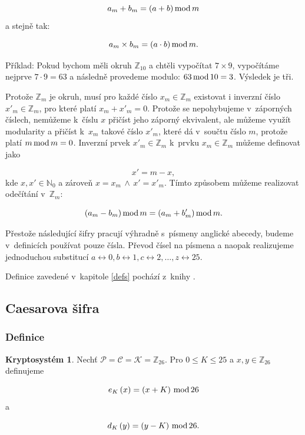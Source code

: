 \documentclass[12pt]{article}
\theoremstyle{definition}
\newtheorem{crypto}{Kryptosystém}
\newcommand{\setp}{\mathcal{P}}
\newcommand{\setc}{\mathcal{C}}
\newcommand{\setk}{\mathcal{K}}
\newcommand{\setz}{\mathbb{Z}}
\renewcommand{\mod}{\mbox{mod\,}}
\newcommand{\alp}{_{26}}
\begin{document}
$$a_m+b_m=(a+b)\, \mod m$$
a stejně tak:

$$a_m\times b_m=(a\cdot b)\, \mod m.$$

Příklad: Pokud bychom měli okruh $\setz_{10}$ a chtěli vypočítat $7\times9$, vypočítáme nejprve $7\cdot9=63$ a následně provedeme modulo: $63\,\mod 10 = 3$. Výsledek je tři. 

Protože $\setz_m$ je okruh, musí pro každé číslo $x_m\in\setz_m$ existovat i inverzní číslo $x'_m\in\setz_m$, pro které platí $x_m+x'_m=0$. Protože se nepohybujeme v~záporných číslech, nemůžeme k~číslu $x$ přičíst jeho záporný ekvivalent, ale můžeme využít modularity a přičíst k~$x_m$ takové číslo $x'_m$, které dá v~součtu číslo $m$, protože platí $m\,\mod m=0$. Inverzní prvek $x'_m\in\setz_m$ k~prvku $x_m\in\setz_m$ můžeme definovat jako

$$x' = m-x,$$
kde $x,x'\in\mathbb{N}_0$ a zároveň $x = x_m\, \wedge\, x'=x'_m$. Tímto způsobem můžeme realizovat odečítání v~$\setz_m$:

$$(a_m-b_m)\,\mod m = (a_m+b'_m)\,\mod m.$$

Přestože následující šifry pracují výhradně s~písmeny anglické abecedy, budeme v~definicích používat pouze čísla. Převod čísel na písmena a naopak realizujeme jednoduchou substitucí $a\leftrightarrow 0, b\leftrightarrow 1, c\leftrightarrow 2, \ldots, z\leftrightarrow 25$. 


Definice zavedené v~kapitole \ref{defs} pochází z~knihy \cite{cryptography}.




\subsection{Caesarova šifra}
\label{caesar}
\subsubsection{Definice}
\begin{crypto}

Nechť $\setp=\setc=\setk=\setz\alp$. Pro $0\le K \le 25$ a $x,y\in\setz\alp$ definujeme

$$e_K\left(x\right)=\left(x+K\right)\,\mod 26$$
a

$$d_K\left(y\right)=\left(y-K\right)\,\mod 26.$$
\end{crypto}
\end{document}
